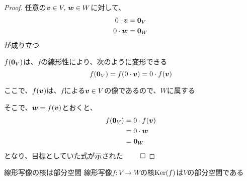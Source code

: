 \documentclass[../../../topic_linear-algebra]{subfiles}
\begin{document}
\begin{proof}
  任意の$\vb*{v} \in V,\, \vb*{w} \in W$に対して、
  \begin{align*}
    0  \cdot \vb*{v} & = \vb*{0}_V \\
    0 \cdot \vb*{w}  & = \vb*{0}_W
  \end{align*}
  が成り立つ

  \br

  $f(\vb*{0}_V)$は、$f$の線形性により、次のように変形できる
  \begin{equation*}
    f(\vb*{0}_V) = f(0 \cdot \vb*{v}) = 0 \cdot f(\vb*{v})
  \end{equation*}

  ここで、$f(\vb*{v})$は、$f$による$\vb*{v} \in V$の像であるので、$W$に属する

  そこで、$\vb*{w} = f(\vb*{v})$とおくと、
  \begin{align*}
    f(\vb*{0}_V) & = 0 \cdot f(\vb*{v}) \\
                 & = 0 \cdot \vb*{w}    \\
                 & = \vb*{0}_W
  \end{align*}
  となり、目標としていた式が示された $\qed$
\end{proof}


\begin{theorem}{線形写像の核は部分空間}
  線形写像$f\colon V \to W$の核$\operatorname{Ker}(f)$は$V$の部分空間である
\end{theorem}
\end{document}
